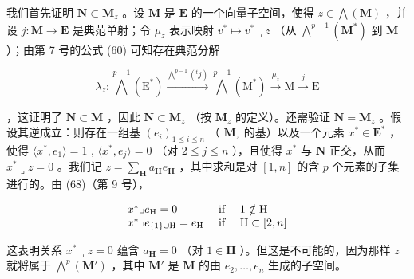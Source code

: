 我们首先证明 \(\mathbf{N} \subset \mathbf{M}_z\) 。设 \(\mathbf{M}\) 是 \(\mathbf{E}\) 的一个向量子空间，使得 \(z \in \bigwedge (\mathbf{M})\) ，并设 \(j: \mathbf{M} \to \mathbf{E}\) 是典范单射；令 \(\mu_z\) 表示映射 \(v^* \mapsto v^* \lrcorner z\) （从 \(\bigwedge^{p-1}(\mathbf{M}^*)\) 到 \(\mathbf{M}\) ）；由第 7 号的公式 (60) 可知存在典范分解

\[
\lambda_ {z}: \bigwedge^ {p - 1} (\mathrm{E} ^ {*}) \xrightarrow {\bigwedge^ {p - 1} ({} ^ {t} j)} \bigwedge^ {p - 1} (\mathrm{M} ^ {*}) \xrightarrow {\mu_ {z}} \mathrm{M} \xrightarrow {j} \mathrm{E}
\]

，这证明了 \(\mathbf{N} \subset \mathbf{M}\) ，因此 \(\mathbf{N} \subset \mathbf{M}_z\) （按 \(\mathbf{M}_z\) 的定义）。还需验证 \(\mathbf{N} = \mathbf{M}_z\) 。假设其逆成立：则存在一组基 \((e_i)_{1 \leqslant i \leqslant n}\) （ \(\mathbf{M}_z\) 的基）以及一个元素 \(x^* \in \mathbf{E}^*\) ，使得 \(\langle x^*, e_1 \rangle = 1\) , \(\langle x^*, e_j \rangle = 0\) （对 \(2 \leqslant j \leqslant n\) ），且使得 \(x^*\) 与 \(\mathbf{N}\) 正交，从而 \(x^* \lrcorner z = 0\) 。我们记 \(z = \sum_{\mathbf{H}} a_{\mathbf{H}} e_{\mathbf{H}}\) ，其中求和是对 \([1, n]\) 的含 \(p\) 个元素的子集进行的。由 (68)（第 9 号），

\[
\begin{array}{l l} x ^ {*} \lrcorner e _ {\mathrm{H}} = 0 & \text { if } \quad 1 \notin \mathrm{H} \\ x ^ {*} \lrcorner e _ {\{1 \} \cup \mathrm{H}} = e _ {\mathrm{H}} & \text { if } \quad \mathrm{H} \subset [ 2, n ] \end{array}
\]

这表明关系 \(x^{*} \lrcorner z = 0\) 蕴含 \(a_{\mathbf{H}} = 0\) （对 \(1 \in \mathbf{H}\) ）。但这是不可能的，因为那样 \(z\) 就将属于 \(\bigwedge^{p}(\mathbf{M}')\) ，其中 \(\mathbf{M}'\) 是 \(\mathbf{M}\) 的由 \(e_2, \ldots, e_n\) 生成的子空间。

